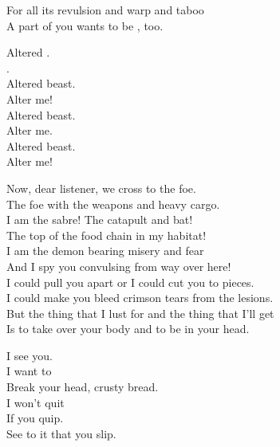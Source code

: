 
For all its revulsion and warp and taboo \\
A part of you wants to be , too. \\


Altered . \\
. \\
Altered beast. \\
Alter me! \\

Altered beast. \\
Alter me. \\
Altered beast. \\
Alter me! \\





Now, dear listener, we cross to the foe. \\
The foe with the weapons and heavy cargo. \\

I am the sabre! The catapult and bat! \\
The top of the food chain in my habitat! \\

I am the demon bearing misery and fear \\
And I spy you convulsing from way over here! \\

I could pull you apart or I could cut you to pieces. \\
I could make you bleed crimson tears from the lesions. \\

But the thing that I lust for and the thing that I'll get \\
Is to take over your body and to be in your head. \\


I see you. \\
I want to \\
Break your head, crusty bread. \\

I won't quit \\
If you quip. \\
See to it that you slip. \\

